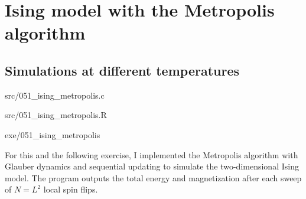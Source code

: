 \chapter{Ising model with the Metropolis algorithm}\label{ch:metropolis}

\section{Simulations at different temperatures}

\begin{sourcefiles}
  \item[Source code] src/051\_ising\_metropolis.c
  \item[Analysis script] src/051\_ising\_metropolis.R
  \item[Executable] exe/051\_ising\_metropolis
\end{sourcefiles}

For this and the following exercise, I implemented the Metropolis algorithm with
Glauber dynamics and sequential updating to simulate the two-dimensional Ising
model. The program outputs the total energy and magnetization after each sweep
of $N = L^{2}$ local spin flips.

